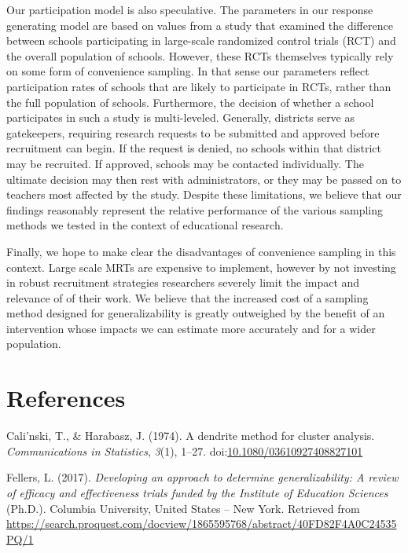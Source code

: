 \documentclass[man,floatsintext]{apa6}
\begin{document}
Our participation model is also speculative. The parameters in our response generating model are based on values from a study that examined the difference between schools participating in large-scale randomized control trials (RCT) and the overall population of schools. However, these RCTs themselves typically rely on some form of convenience sampling. In that sense our parameters reflect participation rates of schools that are likely to participate in RCTs, rather than the full population of schools. Furthermore, the decision of whether a school participates in such a study is multi-leveled. Generally, districts serve as gatekeepers, requiring research requests to be submitted and approved before recruitment can begin. If the request is denied, no schools within that district may be recruited. If approved, schools may be contacted individually. The ultimate decision may then rest with administrators, or they may be passed on to teachers most affected by the study. Despite these limitations, we believe that our findings reasonably represent the relative performance of the various sampling methods we tested in the context of educational research.

Finally, we hope to make clear the disadvantages of convenience sampling in this context. Large scale MRTs are expensive to implement, however by not investing in robust recruitment strategies researchers severely limit the impact and relevance of of their work. We believe that the increased cost of a sampling method designed for generalizability is greatly outweighed by the benefit of an intervention whose impacts we can estimate more accurately and for a wider population.

\hypertarget{references}{%
\section{References}\label{references}}

\begingroup
\setlength{\parindent}{-0.5in}
\setlength{\leftskip}{0.5in}

\hypertarget{refs}{}
\leavevmode\hypertarget{ref-calinskiDendriteMethodCluster1974}{}%
Cali\a'nski, T., \& Harabasz, J. (1974). A dendrite method for cluster analysis. \emph{Communications in Statistics}, \emph{3}(1), 1--27. doi:\href{https://doi.org/10.1080/03610927408827101}{10.1080/03610927408827101}

\leavevmode\hypertarget{ref-fellersDevelopingApproachDetermine2017}{}%
Fellers, L. (2017). \emph{Developing an approach to determine generalizability: A review of efficacy and effectiveness trials funded by the Institute of Education Sciences} (Ph.D.). Columbia University, United States -- New York. Retrieved from \url{https://search.proquest.com/docview/1865595768/abstract/40FD82F4A0C24535PQ/1}
\end{document}
